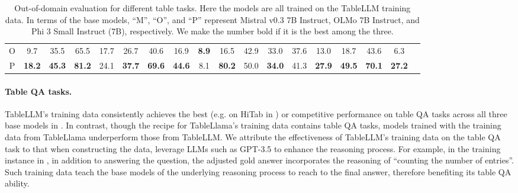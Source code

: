 \documentclass[11pt]{article}
\begin{document}
\begin{table}[t]
{\begin{tabular}{cccccccccccccccccc}
O & 9.7 & 35.5 & 65.5 & 17.7 & 26.7 & 40.6 & 16.9 & \textbf{8.9} & 16.5 & 42.9 & 33.0 & 37.6 & 13.0 & 18.7 & 43.6 & 6.3\\
P & \textbf{18.2} & \textbf{45.3} & \textbf{81.2} & 24.1 & \textbf{37.7} & \textbf{69.6} & \textbf{44.6} & 8.1  & \textbf{80.2} & 50.0 & \textbf{34.0} & 41.3 & \textbf{27.9} & \textbf{49.5} & \textbf{70.1} & \textbf{27.2} \\

\hline
\end{tabular}
}
\caption{Out-of-domain evaluation for different table tasks.
Here the models are all trained on the TableLLM training data.
In terms of the base models, ``M'', ``O'', and ``P'' represent Mistral v0.3 7B Instruct, OLMo 7B Instruct, and Phi 3 Small Instruct (7B), respectively.
We make the number bold if it is the best among the three.
}
\label{tab: model-comparison}
\vspace{-0.5em}
\end{table}

\paragraph{Table QA tasks.}
TableLLM's training data consistently achieves the best (e.g. on HiTab in ) or competitive performance on table QA tasks across all three base models in .
In contrast, though the recipe for TableLlama's training data contains table QA tasks, models trained with the training data from TableLlama underperform those from TableLLM.
We attribute the effectiveness of TableLLM's training data on the table QA task to that when constructing the data, \citet{zhang2024tablellm} leverage LLMs such as GPT-3.5 to enhance the reasoning process.
For example, in the training instance in , in addition to answering the question, the adjusted gold answer incorporates the reasoning of ``counting the number of entries''.
Such training data teach the base models of the underlying reasoning process to reach to the final answer, therefore benefiting its table QA ability.
\end{document}
